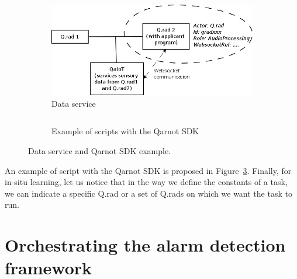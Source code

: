 \documentclass[10pt, conference, compsocconf]{IEEEtran}
\begin{document}
	\begin{figure}[ht]
          \begin{subfigure}[b]{0.4\textwidth}
            \centering
            \includegraphics[scale=0.25]{./Figures/DataService.png}
            \caption{Data service \label{subfig:qaiot}}
          \end{subfigure}
          \begin{subfigure}[b]{0.6\textwidth}
            \centering
            \inputminted[baselinestretch=1, bgcolor=LightGray, fontsize=\scriptsize]{python}{sample.py}
            \caption{Example of scripts with the Qarnot SDK \label{subfig:sample}}
          \end{subfigure}
          \caption{Data service and Qarnot SDK example.} 
          \label{fig:arch}
	\end{figure}

An example of script with the Qarnot SDK is proposed in Figure~\ref{fig:arch}. Finally, for in-situ learning, let us notice that 
in the way we define the constants of a task, we can indicate a specific Q.rad or a set of Q.rads on which we want the task to run.

\section{Orchestrating the alarm detection framework} \label{Orchestrator}
\end{document}

